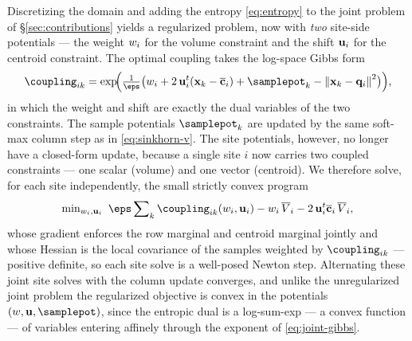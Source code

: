 \documentclass[main.tex]{subfiles}
\begin{document}
Discretizing the domain and adding the entropy \eqref{eq:entropy} to the joint problem of \S\ref{sec:contributions} yields a regularized problem, now with \emph{two} site-side potentials --- the weight $w_i$ for the volume constraint and the shift $\mathbf{u}_i$ for the centroid constraint.
The optimal coupling takes the log-space Gibbs form
\begin{equation}
  \coupling_{ik} = \exp\!\Bigl( \tfrac{1}{\eps} \bigl( \weight_i + 2\,\shift_i\tr (\xx_k - \tcentroid_i) + \samplepot_k - \norm{\xx_k - \qq_i}^2 \bigr) \Bigr) ,
  \label{eq:joint-gibbs}
\end{equation}
in which the weight and shift are exactly the dual variables of the two constraints.
The sample potentials $\samplepot_k$ are updated by the same soft-max column step as in \eqref{eq:sinkhorn-v}.
The site potentials, however, no longer have a closed-form update, because a single site $i$ now carries two coupled constraints --- one scalar (volume) and one vector (centroid).
We therefore solve, for each site independently, the small strictly convex program
\begin{equation}
  \min\nolimits_{\weight_i, \shift_i} \ \eps \sum\nolimits_k \coupling_{ik}(\weight_i, \shift_i)
    - \weight_i \, \pvol_i - 2\,\shift_i\tr \tcentroid_i \, \pvol_i ,
  \label{eq:joint-site-solve}
\end{equation}
whose gradient enforces the row marginal and centroid marginal jointly and whose Hessian is the local covariance of the samples weighted by $\coupling_{ik}$ --- positive definite, so each site solve is a well-posed Newton step.
Alternating these joint site solves with the column update converges, and unlike the unregularized joint problem the regularized objective is convex in the potentials $(\weight, \shift, \samplepot)$, since the entropic dual is a log-sum-exp --- a convex function --- of variables entering affinely through the exponent of \eqref{eq:joint-gibbs}.
\end{document}
